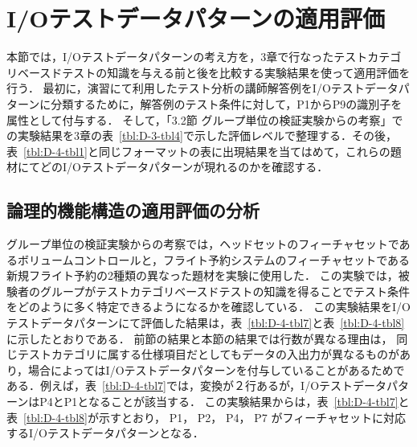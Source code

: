 \newpage
\section{I/Oテストデータパターンの適用評価}
本節では，I/Oテストデータパターンの考え方を，3章で行なったテストカテゴリベースドテストの知識を与える前と後を比較する実験結果を使って適用評価を行う．
最初に，演習にて利用したテスト分析の講師解答例をI/Oテストデータパターンに分類するために，解答例のテスト条件に対して，P1からP9の識別子を属性として付与する．
そして，「3.2節 グループ単位の検証実験からの考察」での実験結果を3章の表~\ref{tbl:D-3-tbl4}で示した評価レベルで整理する．その後，表~\ref{tbl:D-4-tbl1}と同じフォーマットの表に出現結果を当てはめて，これらの題材にてどのI/Oテストデータパターンが現れるのかを確認する．

\subsection{論理的機能構造の適用評価の分析}
グループ単位の検証実験からの考察では，ヘッドセットのフィーチャセットであるボリュームコントロールと，フライト予約システムのフィーチャセットである新規フライト予約の2種類の異なった題材を実験に使用した．
この実験では，被験者のグループがテストカテゴリベースドテストの知識を得ることでテスト条件をどのように多く特定できるようになるかを確認している．
この実験結果をI/Oテストデータパターンにて評価した結果は，表~\ref{tbl:D-4-tbl7}と表~\ref{tbl:D-4-tbl8}に示したとおりである．
前節の結果と本節の結果では行数が異なる理由は， 同じテストカテゴリに属する仕様項目だとしてもデータの入出力が異なるものがあり，場合によってはI/Oテストデータパターンを付与していることがあるためである．例えば，表~\ref{tbl:D-4-tbl7}では，変換が２行あるが，I/OテストデータパターンはP4とP1となることが該当する．
この実験結果からは，表~\ref{tbl:D-4-tbl7}と表~\ref{tbl:D-4-tbl8}が示すとおり， P1， P2， P4， P7 がフィーチャセットに対応するI/Oテストデータパターンとなる．


